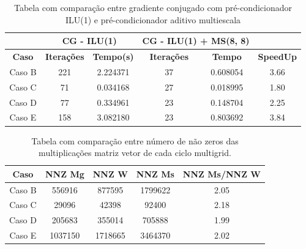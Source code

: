 \begin{table}[]

\caption{Tabela com comparação entre gradiente conjugado com pré-condicionador ILU(1) e pré-condicionador aditivo multiescala} \label{tab:comparacaoILU}

\begin{tabular}{c|c|c|c|c|c}
\cline{2-5}
                                    & \multicolumn{2}{c|}{\textbf{CG - ILU(1)}} & \multicolumn{2}{c|}{\textbf{CG - ILU(1) + MS(8, 8)}} &                                       \\ \hline
\multicolumn{1}{|c|}{\textbf{Caso}} & \textbf{Iterações}   & \textbf{Tempo(s)}  & \textbf{Iterações}          & \textbf{Tempo}         & \multicolumn{1}{c|}{\textbf{SpeedUp}} \\ \hline
\multicolumn{1}{|c|}{Caso B}        & 221                  & 2.224371           & 37                          & 0.608054               & \multicolumn{1}{c|}{3.66}             \\ \hline
\multicolumn{1}{|c|}{Caso C}        & 71                   & 0.034168           & 27                          & 0.018995               & \multicolumn{1}{c|}{1.80}             \\ \hline
\multicolumn{1}{|c|}{Caso D}        & 77                   & 0.334961           & 23                          & 0.148704               & \multicolumn{1}{c|}{2.25}             \\ \hline
\multicolumn{1}{|c|}{Caso E}        & 158                  & 3.082180           & 23                          & 0.803692               & \multicolumn{1}{c|}{3.84}             \\ \hline
\end{tabular}
\end{table}

\begin{table}[]
\centering
\caption{Tabela com comparação entre número de não zeros das multiplicações matriz vetor de cada ciclo multigrid.} \label{tab:comparacaoMsxMgProlongamento}
\begin{tabular}{|c|c|c|c|c|}
\hline
\textbf{Caso} & \textbf{NNZ Mg} & \textbf{NNZ W} & \textbf{NNZ Ms} & \textbf{NNZ Ms/NNZ W} \\ \hline
Caso B        & 556916                       & 877595                   & 1799622                  & 2.05                                     \\ \hline
Caso C        & 29096                        & 42398                    & 92400                    & 2.18                                     \\ \hline
Caso D        & 205683                       & 355014                   & 705888                   & 1.99                                     \\ \hline
Caso E        & 1037150                      & 1718665                  & 3464370                  & 2.02                                     \\ \hline
\end{tabular}
\end{table}



